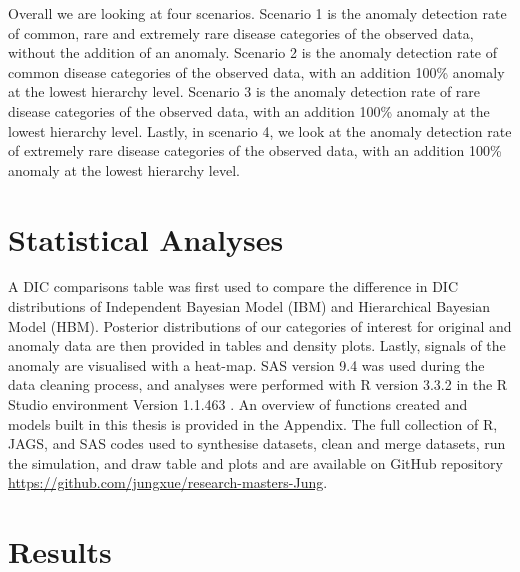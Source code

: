 \newpara

%    

Overall we are looking at four scenarios. Scenario 1 is the anomaly detection rate of common, rare and extremely rare disease categories of the observed data, without the addition of an anomaly. Scenario 2 is the anomaly detection rate of common disease categories of the observed data, with an addition 100\% anomaly at the lowest hierarchy level. Scenario 3 is the anomaly detection rate of rare disease categories of the observed data, with an addition 100\% anomaly at the lowest hierarchy level. Lastly, in scenario 4, we look at the anomaly detection rate of extremely rare disease categories of the observed data, with an addition 100\% anomaly at the lowest hierarchy level. 

\section{Statistical Analyses}

A DIC comparisons table was first used to compare the difference in DIC distributions of Independent Bayesian Model (IBM) and Hierarchical Bayesian Model (HBM). Posterior distributions of our categories of interest for original and anomaly data are then provided in tables and density plots. Lastly, signals of the anomaly are visualised with a heat-map. SAS version 9.4 \citep{SAS} was used during the data cleaning process, and analyses were performed with R version 3.3.2 \citep{R} in the R Studio environment Version 1.1.463 \citep{Rstudio}. An overview of functions created and models built in this thesis is provided in the Appendix. The full collection of R, JAGS, and SAS codes used to synthesise datasets, clean and merge datasets, run the simulation, and draw table and plots and are available on GitHub repository
\href{https://github.com/jungxue/research-masters-Jung}{https://github.com/jungxue/research-masters-Jung}.


\newpage

\section{Results}

